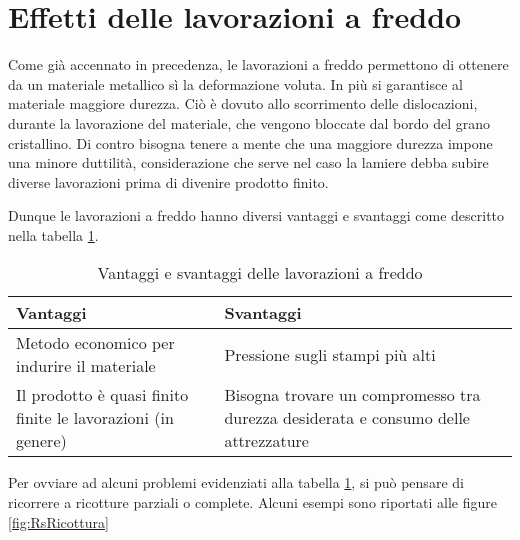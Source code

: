 \section{Effetti delle lavorazioni a freddo}
Come già accennato in precedenza, le lavorazioni a freddo permettono di ottenere da un materiale metallico sì la deformazione voluta. In più si garantisce al materiale maggiore durezza.
Ciò è dovuto allo scorrimento delle dislocazioni, durante la lavorazione del materiale, che vengono bloccate dal bordo del grano cristallino.
Di contro bisogna tenere a mente che una maggiore durezza impone una minore duttilità, considerazione che serve nel caso la lamiere debba subire diverse lavorazioni prima di divenire prodotto finito.

Dunque le lavorazioni a freddo hanno diversi vantaggi e svantaggi come descritto nella tabella \ref{tab:VantSvantFreddo}.

\begin{table}
\centering
\caption{Vantaggi e svantaggi delle lavorazioni a freddo}
\label{tab:VantSvantFreddo}
\begin{tabularx}{\textwidth}{XX}
\toprule
\textcolor{UnifeDark}{\textbf{Vantaggi}} & \textcolor{UnifeDark}{\textbf{Svantaggi}}\\
\midrule
Metodo economico per indurire il materiale &
Pressione sugli stampi più alti\\
Il prodotto è quasi finito finite le lavorazioni (in genere) &
Bisogna trovare un compromesso tra durezza desiderata e consumo delle attrezzature\\
\bottomrule
\end{tabularx}
\end{table}

Per ovviare ad alcuni problemi evidenziati alla tabella \ref{tab:VantSvantFreddo}, si può pensare di ricorrere a ricotture parziali o complete.
Alcuni esempi sono riportati alle figure \ref{fig:RsRicottura}

